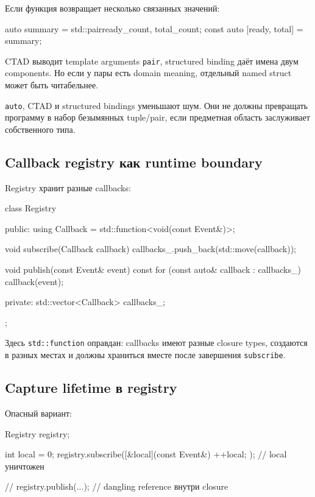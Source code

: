 Если функция возвращает несколько связанных значений:

\begin{cppcode}
auto summary = std::pair{ready_count, total_count};
const auto [ready, total] = summary;
\end{cppcode}

CTAD выводит template arguments \texttt{pair}, structured binding даёт имена
двум components. Но если у пары есть domain meaning, отдельный named struct
может быть читабельнее.

\begin{whybox}
\texttt{auto}, CTAD и structured bindings уменьшают шум. Они не должны
превращать программу в набор безымянных tuple/pair, если предметная область
заслуживает собственного типа.
\end{whybox}

\subsection{Callback registry как runtime boundary}

Registry хранит разные callbacks:

\begin{cppcode}
class Registry {
public:
    using Callback = std::function<void(const Event&)>;

    void subscribe(Callback callback) {
        callbacks_.push_back(std::move(callback));
    }

    void publish(const Event& event) const {
        for (const auto& callback : callbacks_) {
            callback(event);
        }
    }

private:
    std::vector<Callback> callbacks_;
};
\end{cppcode}

Здесь \texttt{std::function} оправдан: callbacks имеют разные closure types,
создаются в разных местах и должны храниться вместе после завершения
\texttt{subscribe}.

\subsection{Capture lifetime в registry}

Опасный вариант:

\begin{cppcode}
Registry registry;

{
    int local = 0;
    registry.subscribe([&local](const Event&) {
        ++local;
    });
} // local уничтожен

// registry.publish(...); // dangling reference внутри closure
\end{cppcode}

